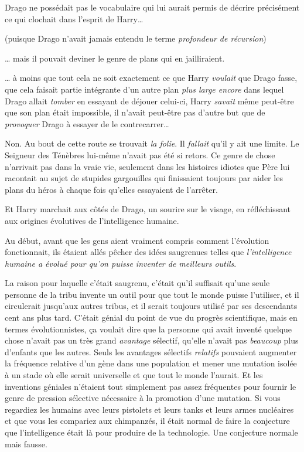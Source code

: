 Drago ne possédait pas le vocabulaire qui lui aurait permis de décrire précisément ce qui clochait dans l'esprit de Harry…

(puisque Drago n'avait jamais entendu le terme \emph{profondeur de récursion})

… mais il pouvait deviner le genre de plans qui en jailliraient.

… à moins que tout cela ne soit exactement ce que Harry \emph{voulait} que Drago fasse, que cela faisait partie intégrante d'un autre plan \emph{plus large encore} dans lequel Drago allait \emph{tomber} en essayant de déjouer celui-ci, Harry \emph{savait} même peut-être que son plan était impossible, il n'avait peut-être pas d'autre but que de \emph{provoquer} Drago à essayer de le contrecarrer…

Non. Au bout de cette route se trouvait \emph{la folie}. Il \emph{fallait} qu'il y ait une limite. Le Seigneur des Ténèbres lui-même n'avait pas été si retors. Ce genre de chose n'arrivait pas dans la vraie vie, seulement dans les histoires idiotes que Père lui racontait au sujet de stupides gargouilles qui finissaient toujours par aider les plans du héros à chaque fois qu'elles essayaient de l'arrêter.

\later

Et Harry marchait aux côtés de Drago, un sourire sur le visage, en réfléchissant aux origines évolutives de l'intelligence humaine.

Au début, avant que les gens aient vraiment compris comment l'évolution fonctionnait, ils étaient allés pêcher des idées saugrenues telles que \emph{l'intelligence humaine a évolué pour qu'on puisse inventer de meilleurs outils}.

La raison pour laquelle c'était saugrenu, c'était qu'il suffisait qu'une seule personne de la tribu invente un outil pour que tout le monde puisse l'utiliser, et il circulerait jusqu'aux autres tribus, et il serait toujours utilisé par ses descendants cent ans plus tard. C'était génial du point de vue du progrès scientifique, mais en termes évolutionnistes, ça voulait dire que la personne qui avait inventé quelque chose n'avait pas un très grand \emph{avantage} sélectif, qu'elle n'avait pas \emph{beaucoup} plus d'enfants que les autres. Seuls les avantages sélectifs \emph{relatifs} pouvaient augmenter la fréquence relative d'un gène dans une population et mener une mutation isolée à un stade où elle serait universelle et que tout le monde l'aurait. Et les inventions géniales n'étaient tout simplement pas assez fréquentes pour fournir le genre de pression sélective nécessaire à la promotion d'une mutation. Si vous regardiez les humains avec leurs pistolets et leurs tanks et leurs armes nucléaires et que vous les compariez aux chimpanzés, il était normal de faire la conjecture que l'intelligence était là pour produire de la technologie. Une conjecture normale mais fausse.

